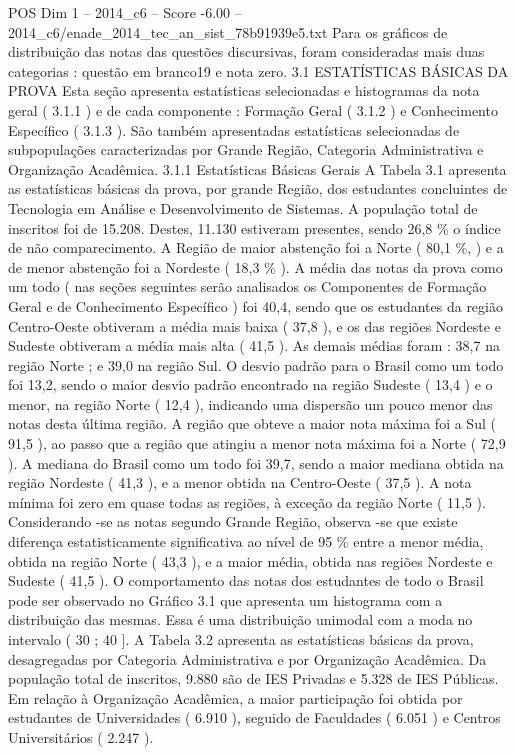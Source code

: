 \begin{textsample}{POS Dim 1 – 2014\_c6 – Score -6.00 – 2014\_c6/enade\_2014\_tec\_an\_sist\_78b91939e5.txt}
Para os gráficos de distribuição das notas das questões discursivas, foram consideradas mais duas categorias : questão em branco19 e nota zero. 3.1 ESTATÍSTICAS BÁSICAS DA PROVA Esta seção apresenta estatísticas selecionadas e histogramas da nota geral ( 3.1.1 ) e de cada componente : Formação Geral ( 3.1.2 ) e Conhecimento Específico ( 3.1.3 ).
São também apresentadas estatísticas selecionadas de subpopulações caracterizadas por Grande Região, Categoria Administrativa e Organização Acadêmica. 3.1.1 Estatísticas Básicas Gerais A Tabela 3.1 apresenta as estatísticas básicas da prova, por grande Região, dos estudantes concluintes de Tecnologia em Análise e Desenvolvimento de Sistemas.
A população total de inscritos foi de 15.208.
Destes, 11.130 estiveram presentes, sendo 26,8 \% o índice de não comparecimento.
A Região de maior abstenção foi a Norte ( 80,1 \%, ) e a de menor abstenção foi a Nordeste ( 18,3 \% ).
A média das notas da prova como um todo ( nas seções seguintes serão analisados os Componentes de Formação Geral e de Conhecimento Específico ) foi 40,4, sendo que os estudantes da região Centro-Oeste obtiveram a média mais baixa ( 37,8 ), e os das regiões Nordeste e Sudeste obtiveram a média mais alta ( 41,5 ).
As demais médias foram : 38,7 na região Norte ; e 39,0 na região Sul.
O desvio padrão para o Brasil como um todo foi 13,2, sendo o maior desvio padrão encontrado na região Sudeste ( 13,4 ) e o menor, na região Norte ( 12,4 ), indicando uma dispersão um pouco menor das notas desta última região.
A região que obteve a maior nota máxima foi a Sul ( 91,5 ), ao passo que a região que atingiu a menor nota máxima foi a Norte ( 72,9 ).
A mediana do Brasil como um todo foi 39,7, sendo a maior mediana obtida na região Nordeste ( 41,3 ), e a menor obtida na Centro-Oeste ( 37,5 ).
A nota mínima foi zero em quase todas as regiões, à exceção da região Norte ( 11,5 ).
Considerando -se as notas segundo Grande Região, observa -se que existe diferença estatisticamente significativa ao nível de 95 \% entre a menor média, obtida na região Norte ( 43,3 ), e a maior média, obtida nas regiões Nordeste e Sudeste ( 41,5 ).
O comportamento das notas dos estudantes de todo o Brasil pode ser observado no Gráfico 3.1 que apresenta um histograma com a distribuição das mesmas.
Essa é uma distribuição unimodal com a moda no intervalo ( 30 ; 40 ].
A Tabela 3.2 apresenta as estatísticas básicas da prova, desagregadas por Categoria Administrativa e por Organização Acadêmica.
Da população total de inscritos, 9.880 são de IES Privadas e 5.328 de IES Públicas.
Em relação à Organização Acadêmica, a maior participação foi obtida por estudantes de Universidades ( 6.910 ), seguido de Faculdades ( 6.051 ) e Centros Universitários ( 2.247 ).

\end{textsample}
